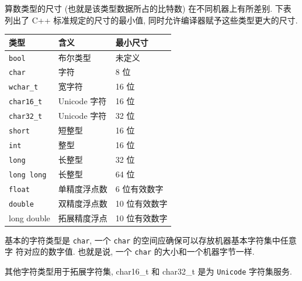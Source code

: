 \documentclass[lang=cn]{elegantbook}
\begin{document}
算数类型的尺寸 (也就是该类型数据所占的比特数) 在不同机器上有所差别. 下表列出了
C++ 标准规定的尺寸的最小值, 同时允许编译器赋予这些类型更大的尺寸.

\begin{table}[htbp]
\label{C++: 算数类型}
\centering
\begin{tabular}{lll}
类型 & 含义 & 最小尺寸\\
\hline
\texttt{bool} & 布尔类型 & 未定义\\
\texttt{char} & 字符 & 8 位\\
\texttt{wchar\_t} & 宽字符 & 16 位\\
\texttt{char16\_t} & Unicode 字符 & 16 位\\
\texttt{char32\_t} & Unicode 字符 & 32 位\\
\texttt{short} & 短整型 & 16 位\\
\texttt{int} & 整型 & 16 位\\
\texttt{long} & 长整型 & 32 位\\
\texttt{long long} & 长整型 & 64 位\\
\texttt{float} & 单精度浮点数 & 6 位有效数字\\
\texttt{double} & 双精度浮点数 & 10 位有效数字\\
long double & 拓展精度浮点 & 10 位有效数字\\
\end{tabular}
\end{table}

基本的字符类型是 \texttt{char}, 一个 \texttt{char} 的空间应确保可以存放机器基本字符集中任意字
符对应的数字值. 也就是说, 一个 \texttt{char} 的大小和一个机器字节一样.

其他字符类型用于拓展字符集, char16\_t 和 char32\_t 是为 \texttt{Unicode} 字符集服务.
\end{document}
